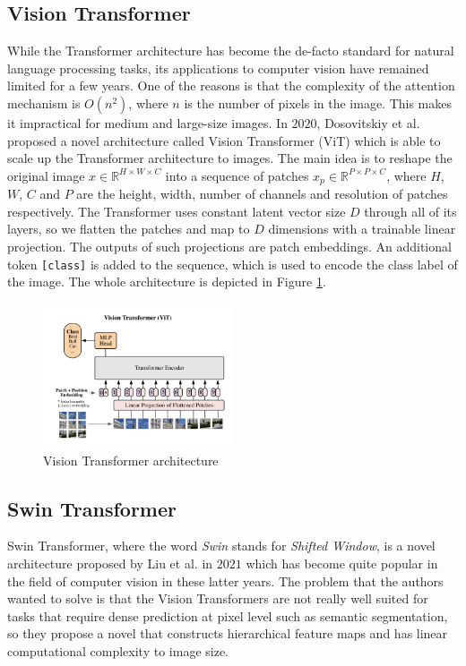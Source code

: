 \subsection{Vision Transformer}
While the Transformer architecture has become the de-facto standard for natural
language processing tasks, its applications to computer vision have remained
limited for a few years. One of the reasons is that the complexity of the
attention mechanism is $O(n^2)$, where $n$ is the number of pixels in the image.
This makes it impractical for medium and large-size images. In $2020$,
Dosovitskiy et al. \cite{dosovitskiy2020image} proposed a novel architecture
called Vision Transformer (ViT) which is able to scale up the Transformer
architecture to images. The main idea is to reshape the original image $x \in
\mathbb{R}^{H \times W \times C}$ into a sequence of patches $x_p \in
\mathbb{R}^{P \times P \times C}$, where $H$, $W$, $C$ and $P$ are the height,
width, number of channels and resolution of patches respectively. The
Transformer uses constant latent vector size $D$ through all of its layers, so
we flatten the patches and map to $D$ dimensions with a trainable linear
projection. The outputs of such projections are patch embeddings. An additional
token \texttt{[class]} is added to the sequence, which is used to encode the
class label of the image. The whole architecture is depicted in Figure
\ref{fig:visiontransformer}.

\begin{figure}[ht!]
  \centering
  \includegraphics[width=0.5\textwidth]{Images/ViT.png}
  \caption{Vision Transformer architecture}
  \label{fig:visiontransformer}
\end{figure}

\subsection{Swin Transformer}
Swin Transformer, where the word \emph{Swin} stands for \emph{Shifted Window},
is a novel architecture proposed by Liu et al. \cite{liu2021swin} in $2021$
which has become quite popular in the field of computer vision in these latter
years. The problem that the authors wanted to solve is that the Vision
Transformers are not really well suited for tasks that require dense prediction
at pixel level such as semantic segmentation, so they propose a novel that
constructs hierarchical feature maps and has linear computational complexity to
image size.

